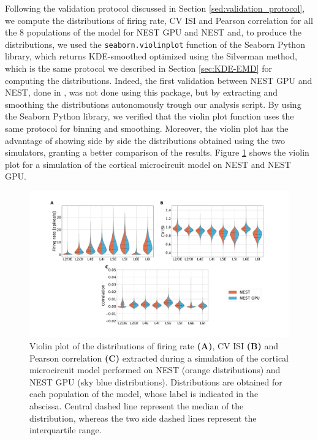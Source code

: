 \documentclass[a4paper, 12pt, twoside, openright]{book}
\begin{document}
Following the validation protocol discussed in Section \ref{sed:validation_protocol}, we compute the distributions of firing rate, CV ISI and Pearson correlation for all the $8$ populations of the model for NEST GPU and NEST and, to produce the distributions, we used the \texttt{seaborn.violinplot} function of the Seaborn Python library\cite{seaborn}, which returns KDE-smoothed optimized using the Silverman method, which is the same protocol we described in Section \ref{sec:KDE-EMD} for computing the distributions. Indeed, the first validation between NEST GPU and NEST, done in \cite{Golosio2021}, was not done using this package, but by extracting and smoothing the distributions autonomously trough our analysis script. By using the Seaborn Python library, we verified that the violin plot function uses the same protocol for binning and smoothing. Moreover, the violin plot has the advantage of showing side by side the distributions obtained using the two simulators, granting a better comparison of the results. Figure \ref{fig:violinplot_cm} shows the violin plot for a simulation of the cortical microcircuit model on NEST and NEST GPU.

\begin{figure}[H]
    \centering
    \includegraphics[trim=6cm 0 6cm 0, clip, width=\columnwidth]{figures/distributions_violinplot_cm_NEST_NGPU.pdf}
    \caption{Violin plot of the distributions of firing rate \textbf{(A)}, CV ISI \textbf{(B)} and Pearson correlation \textbf{(C)} extracted during a simulation of the cortical microcircuit model performed on NEST (orange distributions) and NEST GPU (sky blue distributions). Distributions are obtained for each population of the model, whose label is indicated in the abscissa. Central dashed line represent the median of the distribution, whereas the two side dashed lines represent the interquartile range.}
    \label{fig:violinplot_cm}
\end{figure}
\end{document}

